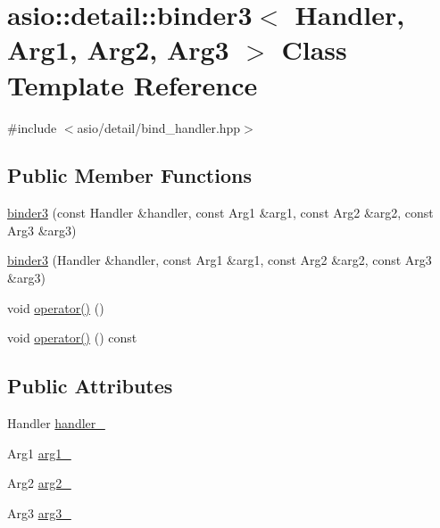\hypertarget{classasio_1_1detail_1_1binder3}{}\section{asio\+:\+:detail\+:\+:binder3$<$ Handler, Arg1, Arg2, Arg3 $>$ Class Template Reference}
\label{classasio_1_1detail_1_1binder3}


{\ttfamily \#include $<$asio/detail/bind\+\_\+handler.\+hpp$>$}

\subsection*{Public Member Functions}
\begin{DoxyCompactItemize}
\item 
\hyperlink{classasio_1_1detail_1_1binder3_a716841b9eccbec259f19d21bbadaf1a8}{binder3} (const Handler \&handler, const Arg1 \&arg1, const Arg2 \&arg2, const Arg3 \&arg3)
\item 
\hyperlink{classasio_1_1detail_1_1binder3_aba9f817b5dd22e764115577e957a5dd9}{binder3} (Handler \&handler, const Arg1 \&arg1, const Arg2 \&arg2, const Arg3 \&arg3)
\item 
void \hyperlink{classasio_1_1detail_1_1binder3_a16d3bdfdfc892d6957d03e7b8011c280}{operator()} ()
\item 
void \hyperlink{classasio_1_1detail_1_1binder3_a4cad850b9e7af8b103c6d62824ef894b}{operator()} () const 
\end{DoxyCompactItemize}
\subsection*{Public Attributes}
\begin{DoxyCompactItemize}
\item 
Handler \hyperlink{classasio_1_1detail_1_1binder3_a7f163de06caa7421ffc36ba2f3a2c26b}{handler\+\_\+}
\item 
Arg1 \hyperlink{classasio_1_1detail_1_1binder3_a493903bcead79f7229b104bfb46e854e}{arg1\+\_\+}
\item 
Arg2 \hyperlink{classasio_1_1detail_1_1binder3_a71664a34f2a1f6adf06c72bc9c22da5a}{arg2\+\_\+}
\item 
Arg3 \hyperlink{classasio_1_1detail_1_1binder3_af73059f968a08758b444c1b9260aa24a}{arg3\+\_\+}
\end{DoxyCompactItemize}


